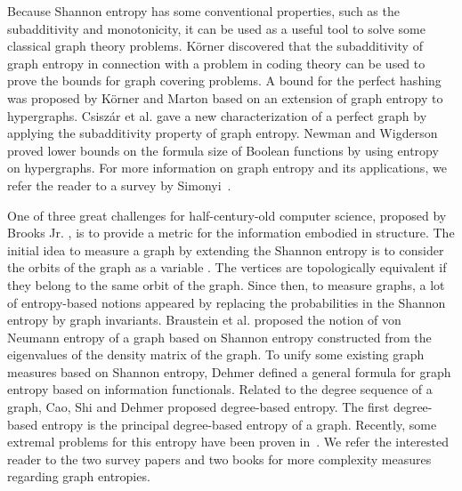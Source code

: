 \documentclass{article}
\begin{document}
Because Shannon entropy has some conventional properties, such as the subadditivity and monotonicity, it can be used as a useful tool to solve some classical graph theory problems. K\"orner \cite{KornerMR0354162} discovered that the subadditivity of graph entropy in connection with a problem in coding theory can be used to prove the bounds for graph covering problems.  A bound for the perfect hashing was proposed by K\"orner and Marton \cite{Korner} based on an extension of graph entropy to hypergraphs. Csisz\'ar et al. \cite{CsiszarMR1075064} gave a new characterization of a perfect graph by applying the subadditivity property of graph entropy. Newman and Wigderson \cite{NewmanMR1361388} proved lower bounds on the formula size of Boolean functions by using entropy on hypergraphs. For more information on graph entropy and its applications, we refer the reader to a survey by Simonyi~\cite{SimonyiMR1338619}.

One of three great challenges for half-century-old computer science, proposed by Brooks Jr. \cite{Brooks10.1145/602382.602397}, is to provide a metric for
the information embodied in structure. The initial idea to measure a graph by extending the Shannon entropy is to consider the orbits of the graph as a variable \cite{RashevskyMR72417}. The vertices are topologically equivalent if they belong to the same orbit of the graph. Since then, to measure graphs, a lot of entropy-based notions appeared by replacing the probabilities in the Shannon entropy by graph invariants. Braustein  et al. \cite{BraunsteinMR2284272} proposed the notion of von Neumann entropy of a graph based on Shannon entropy constructed from the eigenvalues of the density matrix of the graph. To unify some existing graph measures based on Shannon entropy, Dehmer \cite{Dehmerfunctionals} defined a general formula for graph entropy based on information functionals. Related to the degree sequence of a graph, Cao, Shi and Dehmer \cite{CaoMR3212009} proposed degree-based entropy.
The first degree-based entropy is the principal degree-based entropy of a graph. Recently, some extremal problems for this entropy have been proven in~\cite{CDM22,CM22+,CM22+2}.
We refer the interested reader to the two survey papers \cite{DehmerMR2737460,LW16} and two books \cite{ComplexiMR2229139,Mathematical} for more complexity measures regarding graph entropies.

\end{document}
